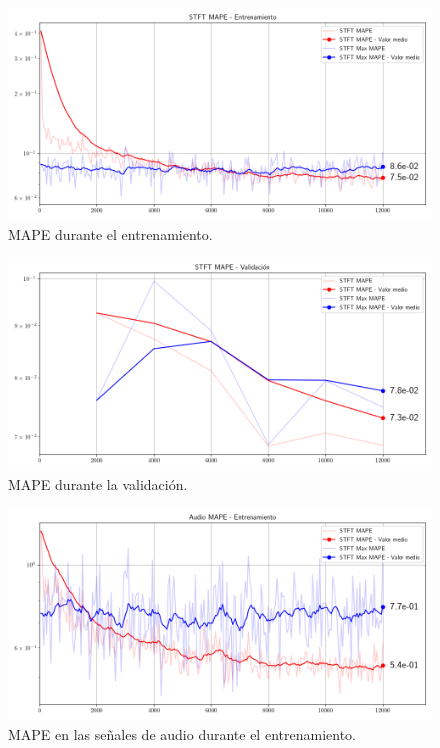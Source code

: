 \begin{figure}
	\centering
	\centerline{\includegraphics[scale=0.65]{images/ch7/entrenamiento/train_stft_mape.png}}
	\caption{MAPE durante el entrenamiento.}
	\label{fig:ch7_entrenamiento_mape}
\end{figure}

\begin{figure}
	\centering
	\centerline{\includegraphics[scale=0.65]{images/ch7/entrenamiento/val_stft_mape.png}}
	\caption{MAPE durante la validación.}
	\label{fig:ch7_val_mape}
\end{figure}

\begin{figure}
	\centering
	\centerline{\includegraphics[scale=0.65]{images/ch7/entrenamiento/train_audio_mape.png}}
	\caption{MAPE en las señales de audio durante el entrenamiento.}
	\label{fig:ch7_entrenamiento_audio_mape}
\end{figure}

